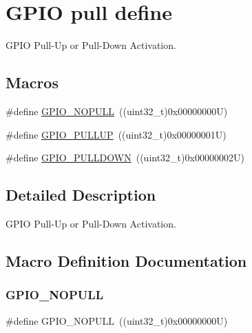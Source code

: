 \hypertarget{group___g_p_i_o__pull__define}{}\section{G\+P\+IO pull define}
\label{group___g_p_i_o__pull__define}


G\+P\+IO Pull-\/\+Up or Pull-\/\+Down Activation.  


\subsection*{Macros}
\begin{DoxyCompactItemize}
\item 
\#define \mbox{\hyperlink{group___g_p_i_o__pull__define_ga5c2862579882c1cc64e36d38fbd07a4c}{G\+P\+I\+O\+\_\+\+N\+O\+P\+U\+LL}}~((uint32\+\_\+t)0x00000000\+U)
\item 
\#define \mbox{\hyperlink{group___g_p_i_o__pull__define_gae689bc8f5c42d6df7bd54a8dd372e072}{G\+P\+I\+O\+\_\+\+P\+U\+L\+L\+UP}}~((uint32\+\_\+t)0x00000001\+U)
\item 
\#define \mbox{\hyperlink{group___g_p_i_o__pull__define_ga75d958d0410c36da7f27d1f4f5c36c14}{G\+P\+I\+O\+\_\+\+P\+U\+L\+L\+D\+O\+WN}}~((uint32\+\_\+t)0x00000002\+U)
\end{DoxyCompactItemize}


\subsection{Detailed Description}
G\+P\+IO Pull-\/\+Up or Pull-\/\+Down Activation. 



\subsection{Macro Definition Documentation}
\mbox{\label{group___g_p_i_o__pull__define_ga5c2862579882c1cc64e36d38fbd07a4c}} 
\subsubsection{\texorpdfstring{GPIO\_NOPULL}{GPIO\_NOPULL}}
{\footnotesize\ttfamily \#define G\+P\+I\+O\+\_\+\+N\+O\+P\+U\+LL~((uint32\+\_\+t)0x00000000\+U)}

